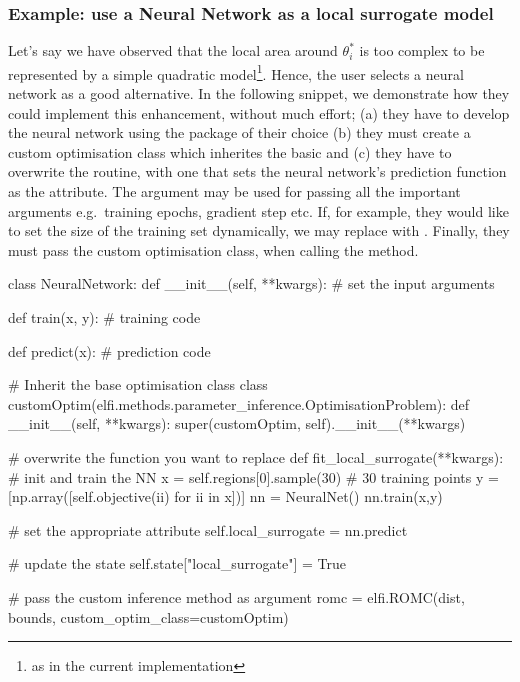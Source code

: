 \subsubsection*{Example: use a Neural Network as a local surrogate model}

Let's say we have observed that the local area around $\theta_i^*$ is
too complex to be represented by a simple quadratic model\footnote{as
  in the current implementation}. Hence, the user selects a neural
network as a good alternative. In the following snippet, we
demonstrate how they could implement this enhancement, without much
effort; (a) they have to develop the neural network using the package
of their choice (b) they must create a custom optimisation class which
inherites the basic  and (c) they have to
overwrite the  routine, with one that
sets the neural network's prediction function as the
 attribute. The argument 
may be used for passing all the important arguments e.g.\ training
epochs, gradient step etc. If, for example, they would like to set the
size of the training set dynamically, we may replace  with . Finally, they must
pass the custom optimisation class, when calling the 
method.

\begin{pythoncode}
  class NeuralNetwork:
      def __init__(self, **kwargs):
          # set the input arguments

      def train(x, y):
          # training code

      def predict(x):
          # prediction code

  # Inherit the base optimisation class
  class customOptim(elfi.methods.parameter_inference.OptimisationProblem):
      def __init__(self, **kwargs):
          super(customOptim, self).__init__(**kwargs)

      # overwrite the function you want to replace
      def fit_local_surrogate(**kwargs):
          # init and train the NN
          x = self.regions[0].sample(30) # 30 training points
          y = [np.array([self.objective(ii) for ii in x])]
          nn = NeuralNet()
          nn.train(x,y)

          # set the appropriate attribute
          self.local_surrogate = nn.predict

          # update the state
          self.state["local_surrogate"] = True

  # pass the custom inference method as argument
  romc = elfi.ROMC(dist, bounds, custom_optim_class=customOptim)
\end{pythoncode}
